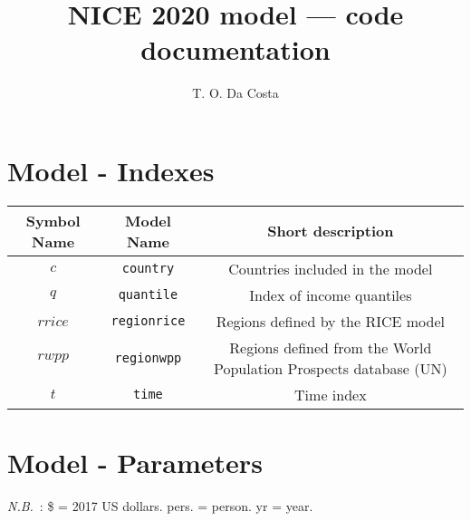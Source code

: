\documentclass[
]{article}
\author{T. O. Da Costa}
\date{}
\title{NICE 2020 model --- code documentation}
\begin{document}
\maketitle
\tableofcontents

\newpage

\section{Model - Indexes}

\renewcommand{\arraystretch}{1.5}
\begin{longtable}{|c|c|c|}
  \hline
  \textbf{Symbol Name} & \textbf{Model Name} & \textbf{Short description} \\
  \hline
  \endhead
  $c$ & \texttt{country} & Countries included in the model \\

  $q$ & \texttt{quantile} & Index of income quantiles \\
  
  $rrice$ & \texttt{regionrice} & Regions defined by the RICE model \\
  
  $rwpp$ &\texttt{regionwpp} & Regions defined from the World Population Prospects database (UN) \\
  
  $t$ & \texttt{time} & Time index \\

  \hline
\end{longtable}



\section{Model - Parameters}

\textit{N.B.} : \$ = 2017 US dollars. pers. = person. yr = year.
\end{document}
